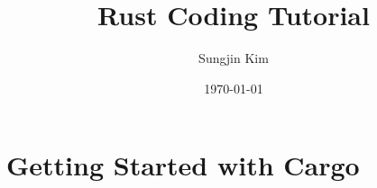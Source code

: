 \documentclass{book}
\title{Rust Coding Tutorial}
\author{Sungjin Kim}
\date{\today}
\begin{document}
\maketitle
\tableofcontents

\chapter{Getting Started with Cargo}
\label{chap:getting_started}



\end{document}
